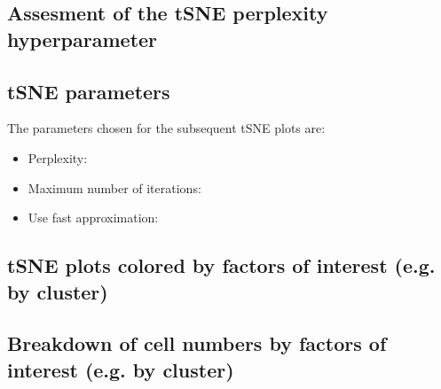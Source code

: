 \subsection{Assesment of the tSNE perplexity hyperparameter}


\clearpage

\subsection{tSNE parameters}

The parameters chosen for the subsequent tSNE plots are:

\begin{itemize}
\item Perplexity: \tSNEPerplexity
\item Maximum number of iterations: \tSNEMaxIter
\item Use fast approximation: \tSNEFast
\end{itemize}

\subsection{tSNE plots colored by factors of interest (e.g. by cluster)}




\subsection{Breakdown of cell numbers by factors of interest (e.g. by cluster)}



